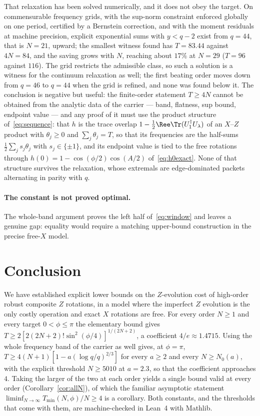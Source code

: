 That relaxation has been solved numerically, and it does not obey the target. On
commensurable frequency grids, with the sup-norm constraint enforced globally on one
period, certified by a Bernstein correction, and with the moment residuals at machine
precision, explicit exponential sums with $y<q-2$ exist from $q=44$, that is $N=21$,
upward; the smallest witness found has $T=83.44$ against $4N=84$, and the saving grows
with $N$, reaching about $17\%$ at $N=29$ ($T=96$ against $116$). The grid restricts the
admissible class, so such a solution is a witness for the continuum relaxation as well;
the first beating order moves down from $q=46$ to $q=44$ when the grid is refined, and
none was found below it. The conclusion is negative but useful: the finite-order
statement $T\ge4N$ cannot be obtained from the analytic data of the carrier --- band,
flatness, sup bound, endpoint value --- and any proof of it must use the product structure
of~\eqref{eq:sequence}: that $h$ is the trace overlap
$1-\tfrac12\Ree\Tr(U_1^\dagger U_\lambda)$ of an $X$--$Z$ product with $\theta_j\ge0$ and
$\sum_j\theta_j=T$, so that its frequencies are the half-sums
$\tfrac12\sum_js_j\theta_j$ with $s_j\in\{\pm1\}$, and its endpoint value is tied to the
free rotations through $h(0)=1-\cos(\phi/2)\cos(A/2)$ of~\eqref{eq:h0exact}. None of that
structure survives the relaxation, whose extremals are edge-dominated packets alternating
in parity with $q$.

\paragraph{The constant is not proved optimal.} The whole-band argument proves the left
half of~\eqref{eq:window} and leaves a genuine gap: equality would require a matching
upper-bound construction in the precise free-$X$ model.

\section{Conclusion}
\label{sec:conclusion}

We have established explicit lower bounds on the $Z$-evolution cost of high-order robust
composite $Z$ rotations, in a model where the imperfect $Z$ evolution is the only costly
operation and exact $X$ rotations are free. For every order $N\ge1$ and every target
$0<\phi\le\pi$ the elementary bound gives
$T\ge2[2(2N+2)!\sin^{2}(\phi/4)]^{1/(2N+2)}$, a coefficient $4/e\approx1.4715$. Using the whole frequency band of the carrier as well
gives, at $\phi=\pi$, $T\ge4(N+1)[1-a(\log q/q)^{2/3}]$ for every $a\ge2$ and every
$N\ge N_0(a)$, with the explicit threshold $N\ge5010$ at $a=2.3$, so that the coefficient
approaches $4$. Taking the
larger of the two at each order yields a single bound valid at every order
(Corollary~\ref{cor:allN}), of which the familiar asymptotic statement
$\liminf_{N\to\infty}T_{\min}(N,\phi)/N\ge4$ is a corollary. Both constants, and the
thresholds that come with them, are machine-checked in Lean~4 with Mathlib.

